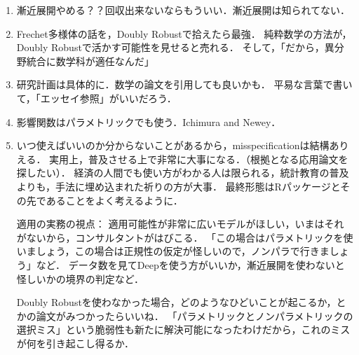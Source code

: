 \documentclass[uplatex, dvipdfmx]{jsarticle}
\begin{document}
\begin{enumerate}
    \item 漸近展開やめる？？回収出来ないならもういい．漸近展開は知られてない．
    \item Frechet多様体の話を，Doubly Robustで拾えたら最強．
    純粋数学の方法が，Doubly Robustで活かす可能性を見せると売れる．
    そして，「だから，異分野統合に数学科が適任なんだ」
    \item 研究計画は具体的に．数学の論文を引用しても良いかも．
    平易な言葉で書いて，「エッセイ参照」がいいだろう．
    \item 影響関数はパラメトリックでも使う．Ichimura and Newey．
    \item いつ使えばいいのか分からないことがあるから，misspecificationは結構ありえる．
    実用上，普及させる上で非常に大事になる．（根拠となる応用論文を探したい）．
    経済の人間でも使い方がわかる人は限られる，統計教育の普及よりも，手法に埋め込まれた祈りの方が大事．
    最終形態はRパッケージとその先であることをよく考えるように．

    適用の実務の視点：
    適用可能性が非常に広いモデルがほしい，いまはそれがないから，コンサルタントがはびこる．
    「この場合はパラメトリックを使いましょう，この場合は正規性の仮定が怪しいので，ノンパラで行きましょう」など．
    データ数を見てDeepを使う方がいいか，漸近展開を使わないと怪しいかの境界の判定など．

    Doubly Robustを使わなかった場合，どのようなひどいことが起こるか，とかの論文がみつかったらいいね．
    「パラメトリックとノンパラメトリックの選択ミス」という脆弱性も新たに解決可能になったわけだから，これのミスが何を引き起こし得るか．
\end{enumerate}
\end{document}
